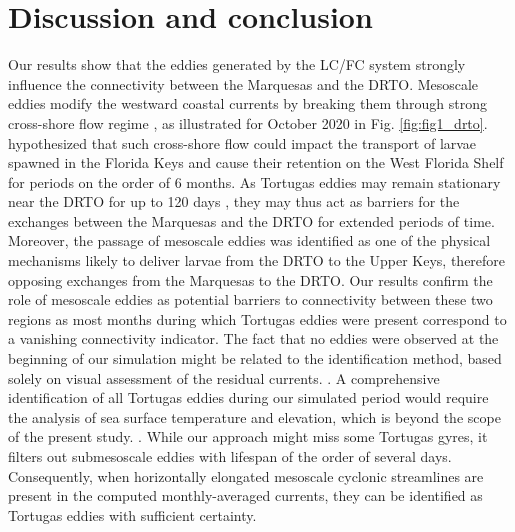 \section{Discussion and conclusion}
Our results show that the eddies generated by the LC/FC system strongly influence the connectivity between the Marquesas and the DRTO. Mesoscale eddies modify the westward coastal currents by breaking them through strong cross-shore flow regime \citep{kourafalou2012florida}, as illustrated for October 2020 in Fig. \ref{fig:fig1_drto}. \cite{lee1994evolution} hypothesized that such cross-shore flow could impact the transport of larvae spawned in the Florida Keys and cause their retention on the West Florida Shelf for periods on the order of 6 months. As Tortugas eddies may remain stationary near the DRTO for up to 120 days \citep{fratantoni1998influence}, they may thus act as barriers for the exchanges between the Marquesas and the DRTO for extended periods of time. Moreover, the passage of mesoscale eddies was identified as one of the physical mechanisms likely to deliver larvae from the DRTO to the Upper Keys, therefore opposing exchanges from the Marquesas to the DRTO. Our results confirm the role of mesoscale eddies as potential barriers to connectivity between these two regions as most months during which Tortugas eddies were present correspond to a vanishing connectivity indicator. The fact that no eddies were observed at the beginning of our simulation might be related to the identification method, based solely on visual assessment of the residual currents. . A comprehensive identification of all Tortugas eddies during our simulated period would require the analysis of sea surface temperature and elevation, which is beyond the scope of the present study. . While our approach might miss some Tortugas gyres, it filters out submesoscale eddies with lifespan of the order of several days. Consequently, when horizontally elongated mesoscale cyclonic streamlines are present in the computed monthly-averaged currents, they can be identified as Tortugas eddies with sufficient certainty.

